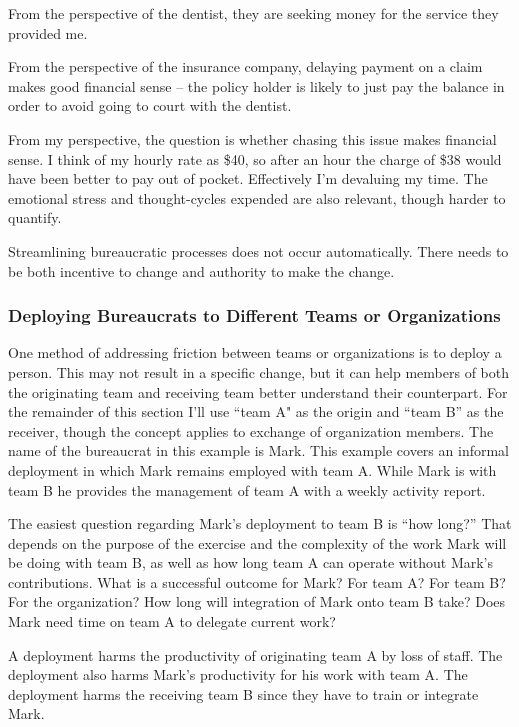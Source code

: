 From the perspective of the dentist, they are seeking money for the service they provided me.

From the perspective of the insurance company, delaying payment on a claim makes good financial sense -- the policy holder is likely to just pay the balance in order to avoid going to court with the dentist.

From my perspective, the question is whether chasing this issue makes financial sense. I think of my hourly rate as \$40, so after an hour the charge of \$38 would have been better to pay out of pocket. Effectively I'm devaluing my time. The emotional stress and thought-cycles expended are also relevant, though harder to quantify.

Streamlining bureaucratic processes does not occur automatically. There needs to be both incentive to change and authority to make the change. 

\subsubsection{Deploying Bureaucrats to Different Teams or Organizations\label{sec:prisoner_exchange}}

One method of addressing friction between teams or organizations is to deploy a person. This may not result in a specific change, but it can help members of both the originating team and receiving team better understand their counterpart. For the remainder of this section I'll use ``team A" as the origin and ``team B'' as the receiver, though the concept applies to exchange of organization members. The name of the bureaucrat in this example is Mark. This example covers an informal deployment in which Mark remains employed with team A. While Mark is with team B he provides the management of team A with a weekly activity report. 

The easiest question regarding Mark's deployment to team B is ``how long?'' That depends on the purpose of the exercise and the complexity of the work Mark will be doing with team B, as well as how long team A can operate without Mark's contributions. What is a successful outcome for Mark? For team A? For team B? For the organization? How long will integration of Mark onto team B take? Does Mark need time on team A to delegate current work?

A deployment harms the productivity of originating team A by loss of staff. The deployment also harms Mark's productivity for his work with team A. The deployment harms the receiving team B since they have to train or integrate Mark. 

